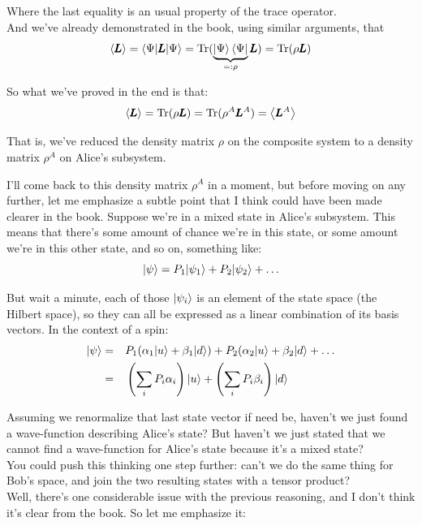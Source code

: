 \documentclass[solutions.tex]{subfiles}
\begin{document}
Where the last equality is an usual property of the trace operator. \\

And we've already demonstrated in the book, using similar arguments, that
\[
	\left\langle \pmb{L} \right\rangle = \langle \Psi|\pmb{L}|\Psi\rangle
		= \text{Tr}(\underbrace{\left| \Psi \right\rangle\left\langle \Psi \right|}_{=:\rho}\pmb{L})
		= \text{Tr}(\rho\pmb{L})
\]

So what we've proved in the end is that:
\[
	\left\langle \pmb{L} \right\rangle = \text{Tr}(\rho\pmb{L}) = \text{Tr}(\rho^A\pmb{L}^A) = \left\langle \pmb{L}^A \right\rangle
\]

That is, we've reduced the density matrix $\rho$ on the composite system
to a density matrix $\rho^A$ on Alice's subsystem.

\hrr

I'll come back to this density matrix $\rho^A$ in a moment, but before
moving on any further, let me emphasize a subtle point that
I think could have been made clearer in the book. Suppose we're in a
mixed state in Alice's subsystem. This means that there's some amount
of chance we're in this state, or some amount we're in this other state,
and so on, something like:
\[
	|\psi\rangle = P_1|\psi_1\rangle + P_2|\psi_2\rangle + \ldots
\]

But wait a minute, each of those $|\psi_i\rangle$ is an element of
the state space (the Hilbert space), so they can all be expressed
as a linear combination of its basis vectors. In the context of
a spin:
\begin{equation*}\begin{aligned}
	|\psi\rangle &=&& P_1(\alpha_1|u\rangle+\beta_1|d\rangle)
		+ P_2(\alpha_2|u\rangle+\beta_2|d\rangle + \ldots \\
	~ &=&& \left(\sum_iP_i\alpha_i\right)|u\rangle
		+ \left(\sum_iP_i\beta_i\right)|d\rangle
\end{aligned}\end{equation*}

Assuming we renormalize that last state vector if need be,
haven't we just found a wave-function describing Alice's state?
But haven't we just stated that we cannot find a wave-function
for Alice's state because it's a mixed state? \\

You could push this thinking one step further: can't we do the
same thing for Bob's space, and join the two resulting states
with a tensor product? \\

Well, there's one considerable issue with the previous reasoning,
and I don't think it's clear from the book. So let me emphasize it:
\end{document}
